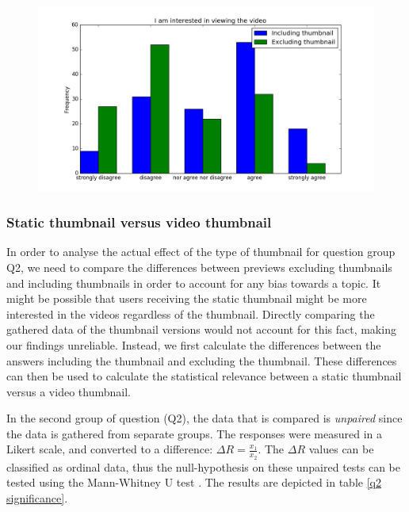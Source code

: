 \documentclass{../resources/sig-alternate-05-2015}
\begin{document}
\begin{figure}[h]
	\label{engagement with without}
	\includegraphics[width=\linewidth]{resources/engagement_with_without}
\end{figure}


\subsubsection{Static thumbnail versus video thumbnail}

In order to analyse the actual effect of the type of thumbnail for question group Q2, we need to compare the differences between previews excluding thumbnails and including thumbnails in order to account for any bias towards a topic. It might be possible that users receiving the static thumbnail might be more interested in the videos regardless of the thumbnail. Directly comparing the gathered data of the thumbnail versions would not account for this fact, making our findings unreliable. Instead, we first calculate the differences between the answers including the thumbnail and excluding the thumbnail. These differences can then be used to calculate the statistical relevance between a static thumbnail versus a video thumbnail.

In the second group of question (Q2), the data that is compared is \textit{unpaired} since the data is gathered from separate groups. The responses were measured in a Likert scale, and converted to a difference: $\Delta R = \frac{x_1}{x_2}$. The $\Delta R$ values can be classified as ordinal data, thus the null-hypothesis on these unpaired tests can be tested using the Mann-Whitney U test \cite{Robson:1993uo}. The results are depicted in table \ref{q2 significance}.
\end{document}
